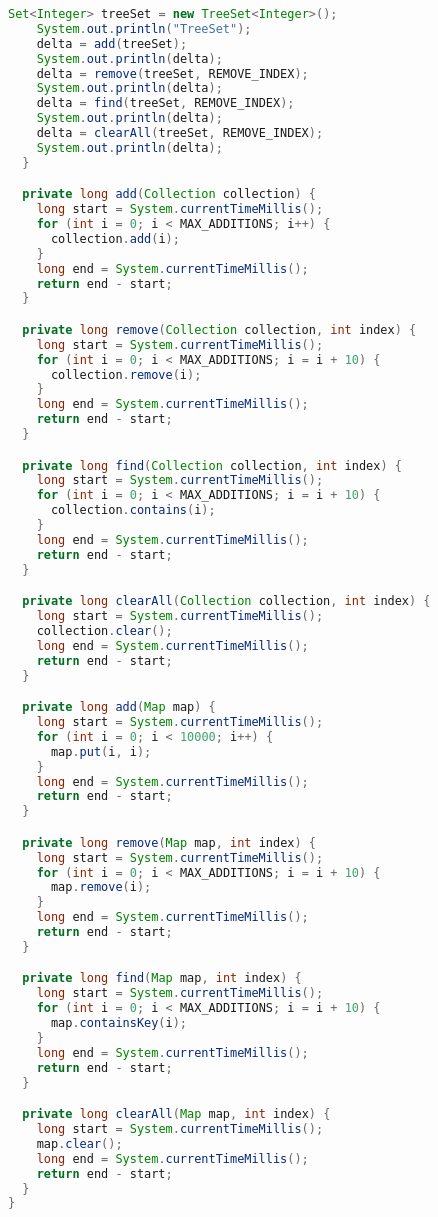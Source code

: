 \begin{lstlisting}[language=Java]
    Set<Integer> treeSet = new TreeSet<Integer>();
    System.out.println("TreeSet");
    delta = add(treeSet);
    System.out.println(delta);
    delta = remove(treeSet, REMOVE_INDEX);
    System.out.println(delta);
    delta = find(treeSet, REMOVE_INDEX);
    System.out.println(delta);
    delta = clearAll(treeSet, REMOVE_INDEX);
    System.out.println(delta);
  }

  private long add(Collection collection) {
    long start = System.currentTimeMillis();
    for (int i = 0; i < MAX_ADDITIONS; i++) {
      collection.add(i);
    }
    long end = System.currentTimeMillis();
    return end - start;
  }

  private long remove(Collection collection, int index) {
    long start = System.currentTimeMillis();
    for (int i = 0; i < MAX_ADDITIONS; i = i + 10) {
      collection.remove(i);
    }
    long end = System.currentTimeMillis();
    return end - start;
  }

  private long find(Collection collection, int index) {
    long start = System.currentTimeMillis();
    for (int i = 0; i < MAX_ADDITIONS; i = i + 10) {
      collection.contains(i);
    }
    long end = System.currentTimeMillis();
    return end - start;
  }

  private long clearAll(Collection collection, int index) {
    long start = System.currentTimeMillis();
    collection.clear();
    long end = System.currentTimeMillis();
    return end - start;
  }

  private long add(Map map) {
    long start = System.currentTimeMillis();
    for (int i = 0; i < 10000; i++) {
      map.put(i, i);
    }
    long end = System.currentTimeMillis();
    return end - start;
  }

  private long remove(Map map, int index) {
    long start = System.currentTimeMillis();
    for (int i = 0; i < MAX_ADDITIONS; i = i + 10) {
      map.remove(i);
    }
    long end = System.currentTimeMillis();
    return end - start;
  }

  private long find(Map map, int index) {
    long start = System.currentTimeMillis();
    for (int i = 0; i < MAX_ADDITIONS; i = i + 10) {
      map.containsKey(i);
    }
    long end = System.currentTimeMillis();
    return end - start;
  }

  private long clearAll(Map map, int index) {
    long start = System.currentTimeMillis();
    map.clear();
    long end = System.currentTimeMillis();
    return end - start;
  }
}
\end{lstlisting}